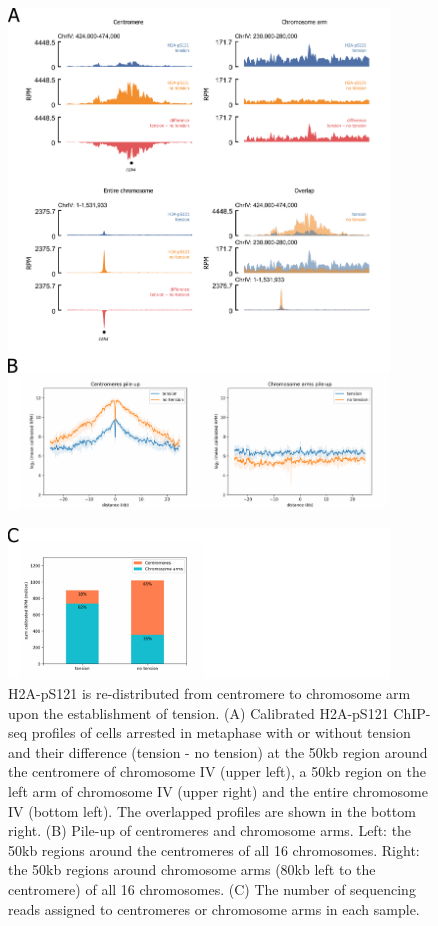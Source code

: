 \begin{figure}[htbp]
  \centering
  \includegraphics[width=0.9\textwidth]{chapter3/figures/pH2A ChIP-seq_1st.pdf}
\end{figure}

\begin{figure}[t]
  \centering
  \includegraphics[width=0.9\textwidth]{chapter3/figures/pH2A ChIP-seq_2nd.pdf}
  \caption[H2A-pS121 is re-distributed from centromere to chromosome arm upon the establishment of tension]{H2A-pS121 is re-distributed from centromere to chromosome arm upon the establishment of tension. (A) Calibrated H2A-pS121 ChIP-seq profiles of cells arrested in metaphase with or without tension and their difference (tension - no tension) at the 50kb region around the centromere of chromosome IV (upper left), a 50kb region on the left arm of chromosome IV (upper right) and the entire chromosome IV (bottom left). The overlapped profiles are shown in the bottom right. (B) Pile-up of centromeres and chromosome arms. Left: the 50kb regions around the centromeres of all 16 chromosomes. Right: the 50kb regions around chromosome arms (80kb left to the centromere) of all 16 chromosomes. (C) The number of sequencing reads assigned to centromeres or chromosome arms in each sample. }
  \label{fig:ph2achipseq2nd}
\end{figure}

